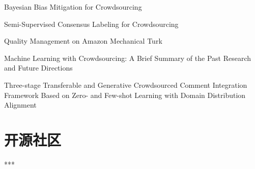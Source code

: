 \documentclass[a4paper]{article}
\begin{document}
Bayesian Bias Mitigation for Crowdsourcing

Semi-Supervised Consensus Labeling for Crowdsourcing

Quality Management on Amazon Mechanical Turk

Machine Learning with Crowdsourcing: A Brief Summary of the Past Research and Future Directions

Three-stage Transferable and Generative Crowdsourced Comment Integration Framework Based on Zero- and Few-shot Learning with Domain Distribution Alignment

\section{开源社区}

***
\end{document}
